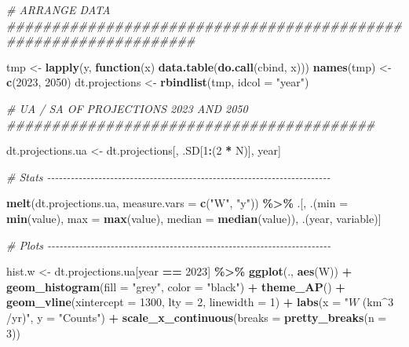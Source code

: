 \documentclass[
  11pt,
]{article}
\newenvironment{Shaded}{\begin{snugshade}}{\end{snugshade}}
\newcommand{\AttributeTok}[1]{\textcolor[rgb]{0.13,0.29,0.53}{#1}}
\newcommand{\CommentTok}[1]{\textcolor[rgb]{0.56,0.35,0.01}{\textit{#1}}}
\newcommand{\ControlFlowTok}[1]{\textcolor[rgb]{0.13,0.29,0.53}{\textbf{#1}}}
\newcommand{\DecValTok}[1]{\textcolor[rgb]{0.00,0.00,0.81}{#1}}
\newcommand{\FunctionTok}[1]{\textcolor[rgb]{0.13,0.29,0.53}{\textbf{#1}}}
\newcommand{\NormalTok}[1]{#1}
\newcommand{\OtherTok}[1]{\textcolor[rgb]{0.56,0.35,0.01}{#1}}
\newcommand{\SpecialCharTok}[1]{\textcolor[rgb]{0.81,0.36,0.00}{\textbf{#1}}}
\newcommand{\StringTok}[1]{\textcolor[rgb]{0.31,0.60,0.02}{#1}}
\begin{document}
\begin{Shaded}
\begin{Highlighting}[]
\CommentTok{\# ARRANGE DATA \#\#\#\#\#\#\#\#\#\#\#\#\#\#\#\#\#\#\#\#\#\#\#\#\#\#\#\#\#\#\#\#\#\#\#\#\#\#\#\#\#\#\#\#\#\#\#\#\#\#\#\#\#\#\#\#\#\#\#\#\#\#\#\#\#}

\NormalTok{tmp }\OtherTok{\textless{}{-}} \FunctionTok{lapply}\NormalTok{(y, }\ControlFlowTok{function}\NormalTok{(x) }\FunctionTok{data.table}\NormalTok{(}\FunctionTok{do.call}\NormalTok{(cbind, x)))}
\FunctionTok{names}\NormalTok{(tmp) }\OtherTok{\textless{}{-}} \FunctionTok{c}\NormalTok{(}\DecValTok{2023}\NormalTok{, }\DecValTok{2050}\NormalTok{)}
\NormalTok{dt.projections }\OtherTok{\textless{}{-}} \FunctionTok{rbindlist}\NormalTok{(tmp, }\AttributeTok{idcol =} \StringTok{"year"}\NormalTok{)}

\CommentTok{\# UA / SA OF PROJECTIONS 2023 AND 2050 \#\#\#\#\#\#\#\#\#\#\#\#\#\#\#\#\#\#\#\#\#\#\#\#\#\#\#\#\#\#\#\#\#\#\#\#\#\#\#\#\#}

\NormalTok{dt.projections.ua }\OtherTok{\textless{}{-}}\NormalTok{ dt.projections[, .SD[}\DecValTok{1}\SpecialCharTok{:}\NormalTok{(}\DecValTok{2} \SpecialCharTok{*}\NormalTok{ N)], year]}

\CommentTok{\# Stats {-}{-}{-}{-}{-}{-}{-}{-}{-}{-}{-}{-}{-}{-}{-}{-}{-}{-}{-}{-}{-}{-}{-}{-}{-}{-}{-}{-}{-}{-}{-}{-}{-}{-}{-}{-}{-}{-}{-}{-}{-}{-}{-}{-}{-}{-}{-}{-}{-}{-}{-}{-}{-}{-}{-}{-}{-}{-}{-}{-}{-}{-}{-}{-}{-}{-}{-}{-}{-}{-}{-}{-}}

\FunctionTok{melt}\NormalTok{(dt.projections.ua, }\AttributeTok{measure.vars =} \FunctionTok{c}\NormalTok{(}\StringTok{"W"}\NormalTok{, }\StringTok{"y"}\NormalTok{)) }\SpecialCharTok{\%\textgreater{}\%}
\NormalTok{  .[, .(}\AttributeTok{min =} \FunctionTok{min}\NormalTok{(value), }
        \AttributeTok{max =} \FunctionTok{max}\NormalTok{(value), }
        \AttributeTok{median =} \FunctionTok{median}\NormalTok{(value)), .(year, variable)]}

\CommentTok{\# Plots {-}{-}{-}{-}{-}{-}{-}{-}{-}{-}{-}{-}{-}{-}{-}{-}{-}{-}{-}{-}{-}{-}{-}{-}{-}{-}{-}{-}{-}{-}{-}{-}{-}{-}{-}{-}{-}{-}{-}{-}{-}{-}{-}{-}{-}{-}{-}{-}{-}{-}{-}{-}{-}{-}{-}{-}{-}{-}{-}{-}{-}{-}{-}{-}{-}{-}{-}{-}{-}{-}{-}{-}}


\NormalTok{hist.w }\OtherTok{\textless{}{-}}\NormalTok{ dt.projections.ua[year }\SpecialCharTok{==} \DecValTok{2023}\NormalTok{] }\SpecialCharTok{\%\textgreater{}\%}
  \FunctionTok{ggplot}\NormalTok{(., }\FunctionTok{aes}\NormalTok{(W)) }\SpecialCharTok{+}
  \FunctionTok{geom\_histogram}\NormalTok{(}\AttributeTok{fill =} \StringTok{"grey"}\NormalTok{, }\AttributeTok{color =} \StringTok{"black"}\NormalTok{) }\SpecialCharTok{+} 
  \FunctionTok{theme\_AP}\NormalTok{() }\SpecialCharTok{+} 
  \FunctionTok{geom\_vline}\NormalTok{(}\AttributeTok{xintercept =} \DecValTok{1300}\NormalTok{, }\AttributeTok{lty =} \DecValTok{2}\NormalTok{, }\AttributeTok{linewidth =} \DecValTok{1}\NormalTok{) }\SpecialCharTok{+}
  \FunctionTok{labs}\NormalTok{(}\AttributeTok{x =} \StringTok{"$W$ (km$\^{}3$/yr)"}\NormalTok{, }\AttributeTok{y =} \StringTok{"Counts"}\NormalTok{) }\SpecialCharTok{+} 
  \FunctionTok{scale\_x\_continuous}\NormalTok{(}\AttributeTok{breaks =} \FunctionTok{pretty\_breaks}\NormalTok{(}\AttributeTok{n =} \DecValTok{3}\NormalTok{))}


\end{Highlighting}
\end{Shaded}
\end{document}
